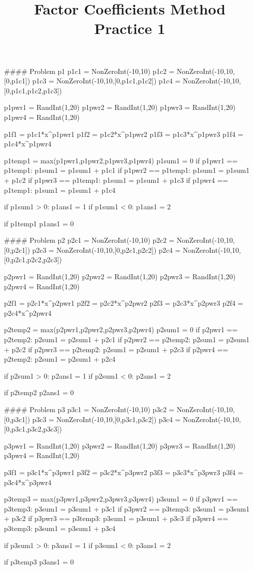 \documentclass{ximera}
\title{Factor Coefficients Method Practice 1}
\begin{document}


\begin{sagesilent}

#### Problem p1
p1c1 = NonZeroInt(-10,10)
p1c2 = NonZeroInt(-10,10,[0,p1c1])
p1c3 = NonZeroInt(-10,10,[0,p1c1,p1c2])
p1c4 = NonZeroInt(-10,10,[0,p1c1,p1c2,p1c3])

p1pwr1 = RandInt(1,20)
p1pwr2 = RandInt(1,20)
p1pwr3 = RandInt(1,20)
p1pwr4 = RandInt(1,20)

p1f1 = p1c1*x^p1pwr1
p1f2 = p1c2*x^p1pwr2
p1f3 = p1c3*x^p1pwr3
p1f4 = p1c4*x^p1pwr4

p1temp1 = max(p1pwr1,p1pwr2,p1pwr3,p1pwr4)
p1sum1 = 0
if p1pwr1 == p1temp1:
    p1sum1 = p1sum1 + p1c1
if p1pwr2 == p1temp1:
    p1sum1 = p1sum1 + p1c2
if p1pwr3 == p1temp1:
    p1sum1 = p1sum1 + p1c3
if p1pwr4 == p1temp1:
    p1sum1 = p1sum1 + p1c4

if p1sum1 > 0:
    p1ans1 = 1
if p1sum1 < 0:
    p1ans1 = 2

if p1temp1%
    p1ans1 = 0



#### Problem p2
p2c1 = NonZeroInt(-10,10)
p2c2 = NonZeroInt(-10,10,[0,p2c1])
p2c3 = NonZeroInt(-10,10,[0,p2c1,p2c2])
p2c4 = NonZeroInt(-10,10,[0,p2c1,p2c2,p2c3])

p2pwr1 = RandInt(1,20)
p2pwr2 = RandInt(1,20)
p2pwr3 = RandInt(1,20)
p2pwr4 = RandInt(1,20)

p2f1 = p2c1*x^p2pwr1
p2f2 = p2c2*x^p2pwr2
p2f3 = p2c3*x^p2pwr3
p2f4 = p2c4*x^p2pwr4

p2temp2 = max(p2pwr1,p2pwr2,p2pwr3,p2pwr4)
p2sum1 = 0
if p2pwr1 == p2temp2:
    p2sum1 = p2sum1 + p2c1
if p2pwr2 == p2temp2:
    p2sum1 = p2sum1 + p2c2
if p2pwr3 == p2temp2:
    p2sum1 = p2sum1 + p2c3
if p2pwr4 == p2temp2:
    p2sum1 = p2sum1 + p2c4

if p2sum1 > 0:
    p2ans1 = 1
if p2sum1 < 0:
    p2ans1 = 2

if p2temp2%
    p2ans1 = 0



#### Problem p3
p3c1 = NonZeroInt(-10,10)
p3c2 = NonZeroInt(-10,10,[0,p3c1])
p3c3 = NonZeroInt(-10,10,[0,p3c1,p3c2])
p3c4 = NonZeroInt(-10,10,[0,p3c1,p3c2,p3c3])

p3pwr1 = RandInt(1,20)
p3pwr2 = RandInt(1,20)
p3pwr3 = RandInt(1,20)
p3pwr4 = RandInt(1,20)

p3f1 = p3c1*x^p3pwr1
p3f2 = p3c2*x^p3pwr2
p3f3 = p3c3*x^p3pwr3
p3f4 = p3c4*x^p3pwr4

p3temp3 = max(p3pwr1,p3pwr2,p3pwr3,p3pwr4)
p3sum1 = 0
if p3pwr1 == p3temp3:
    p3sum1 = p3sum1 + p3c1
if p3pwr2 == p3temp3:
    p3sum1 = p3sum1 + p3c2
if p3pwr3 == p3temp3:
    p3sum1 = p3sum1 + p3c3
if p3pwr4 == p3temp3:
    p3sum1 = p3sum1 + p3c4

if p3sum1 > 0:
    p3ans1 = 1
if p3sum1 < 0:
    p3ans1 = 2

if p3temp3%
    p3ans1 = 0





\end{sagesilent}
\end{document}
